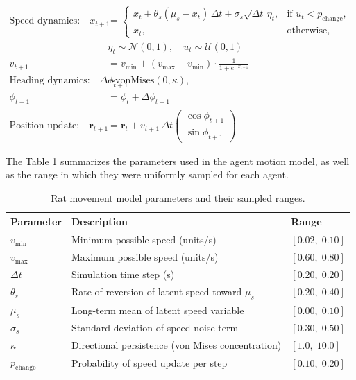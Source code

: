 \documentclass{article}
\begin{document}
\begin{align}
\text{Speed dynamics:} \quad
x_{t+1} &=
\begin{cases}
x_t + \theta_s (\mu_s - x_t)\,\Delta t 
      + \sigma_s \sqrt{\Delta t}\,\eta_t, 
      & \text{if } u_t < p_{\mathrm{change}}, \\[6pt]
x_t, & \text{otherwise,}
\end{cases}
\\[6pt]
& \eta_t \sim \mathcal{N}(0,1), 
\quad u_t \sim \mathcal{U}(0,1) \\[6pt]
v_{t+1} &= v_{\min} 
+ (v_{\max} - v_{\min}) \cdot 
  \frac{1}{1 + e^{-x_{t+1}}} \\[10pt]
\text{Heading dynamics:} \quad
\Delta \phi_{t+1} &\sim \mathrm{vonMises}(0, \kappa), \\[4pt]
\phi_{t+1} &= \phi_t + \Delta \phi_{t+1} \\[10pt]
\text{Position update:} \quad
\mathbf{r}_{t+1} &= \mathbf{r}_t + v_{t+1}\,\Delta t
\begin{pmatrix}
\cos \phi_{t+1} \\
\sin \phi_{t+1}
\end{pmatrix}
\end{align}

The Table \ref{table:params} summarizes the parameters used in the agent motion model, as well as the range in which they were uniformly sampled for each agent.

\begin{table}[h!]
\centering
\caption{Rat movement model parameters and their sampled ranges.}
\begin{tabular}{lll}
\toprule
\textbf{Parameter} & \textbf{Description} & \textbf{Range} \\
\midrule
$v_{\min}$ & Minimum possible speed (units/s) & $[0.02,\; 0.10]$ \\
$v_{\max}$ & Maximum possible speed (units/s) & $[0.60,\; 0.80]$ \\
$\Delta t$ & Simulation time step (s) & $[0.20,\; 0.20]$ \\
$\theta_s$ & Rate of reversion of latent speed toward $\mu_s$ & $[0.20,\; 0.40]$ \\
$\mu_s$ & Long-term mean of latent speed variable & $[0.00,\; 0.10]$ \\
$\sigma_s$ & Standard deviation of speed noise term & $[0.30,\; 0.50]$ \\
$\kappa$ & Directional persistence (von Mises concentration) & $[1.0,\; 10.0]$ \\
$p_{\mathrm{change}}$ & Probability of speed update per step & $[0.10,\; 0.20]$ \\
\bottomrule
\end{tabular}
\label{table:params}
\end{table}
\end{document}
